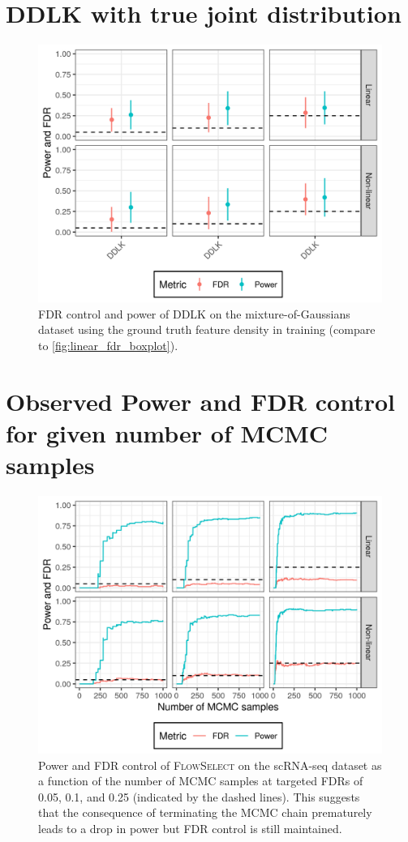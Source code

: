 \documentclass{article}
\newcommand{\FlowSelect}{\textsc{FlowSelect}\xspace}
\begin{document}
\section{DDLK with true joint distribution} \label{sec:ddlk_oracle}

\begin{figure}[ht]
    \centering
    \includegraphics[width=0.5\linewidth]{./fig/gaussian_ar_mixture_d100_n100000_rho0.98_gt_meanplots.png}
    \caption{FDR control and power of DDLK on the mixture-of-Gaussians dataset using the ground truth feature density in training (compare to \cref{fig:linear_fdr_boxplot}).
    }
    \label{fig:ddlk_truejoint}
  \end{figure}

  \clearpage

\section{Observed Power and FDR control for given number of MCMC samples}\label{sec:mcmc_power_fdr}
\begin{figure}[!h]
    \centering
    \includegraphics[width=0.5\linewidth]{./fig/rnasq_asymptotic_fdr_and_power.png}
    \caption{Power and FDR control of \FlowSelect on the scRNA-seq dataset as a function of the number of MCMC samples at targeted FDRs of 0.05, 0.1, and 0.25 (indicated by the dashed lines).
    This suggests that the consequence of terminating the MCMC chain prematurely leads to a drop in power but FDR control is still maintained.
    }
    \label{fig:asymptotic_rnasq}
\end{figure}
\end{document}
